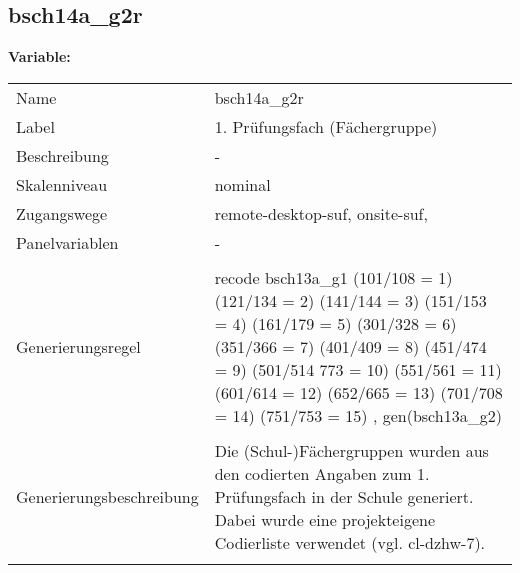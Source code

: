	
	
	\subsection{bsch14a\_g2r}
	\label{subSection:bsch14a_g2r}

	\noindent\textbf{Variable:}\\
		\begin{tabular}{lL{11.3cm}}
			\label{tableVariable:bsch14a_g2r}
			Name & bsch14a\_g2r \\
			Label & 1. Prüfungsfach (Fächergruppe) \\
			Beschreibung & - \\
			Skalenniveau & nominal \\
			Zugangswege &
				remote-desktop-suf,
				onsite-suf,
 \\
			Panelvariablen & -
			 \\
			 \\
					Generierungsregel & recode bsch13a\_g1 (101/108 = 1) (121/134 = 2) (141/144 = 3) 
(151/153 = 4) (161/179 = 5) (301/328 = 6) (351/366 = 7) 
(401/409 = 8) (451/474 = 9) (501/514 773 = 10) (551/561 = 11) 
(601/614 = 12) (652/665 = 13) (701/708 = 14) (751/753 = 15)
, gen(bsch13a\_g2) \\
				 \\
					Generierungsbeschreibung & Die (Schul-)Fächergruppen wurden aus den codierten Angaben zum 1. Prüfungsfach in der Schule generiert. Dabei wurde eine projekteigene Codierliste verwendet (vgl. cl-dzhw-7).
				 \\	
			 \\
		\end{tabular}






